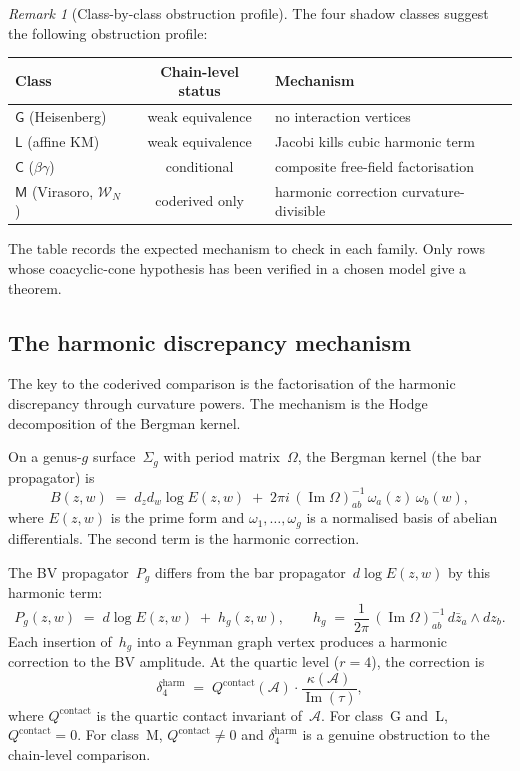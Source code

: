 \documentclass[11pt,reqno]{amsart}
\theoremstyle{definition}
\theoremstyle{remark}
\newtheorem{remark}[theorem]{Remark}
\newcommand{\cA}{\mathcal{A}}
\newcommand{\cW}{\mathcal{W}}
\numberwithin{equation}{section}
\begin{document}
\begin{remark}[Class-by-class obstruction profile]
\label{rem:class-by-class}
The four shadow classes suggest the following obstruction profile:
\begin{center}
\small
\renewcommand{\arraystretch}{1.15}
\begin{tabular}{lcl}
\toprule
Class & Chain-level status & Mechanism \\
\midrule
$\mathsf{G}$ (Heisenberg) & weak equivalence
 & no interaction vertices \\
$\mathsf{L}$ (affine KM) & weak equivalence
 & Jacobi kills cubic harmonic term \\
$\mathsf{C}$ ($\beta\gamma$) & conditional
 & composite free-field factorisation \\
$\mathsf{M}$ (Virasoro, $\cW_N$) & coderived only
 & harmonic correction curvature-divisible \\
\bottomrule
\end{tabular}
\end{center}
The table records the expected mechanism to check in each family.
Only rows whose coacyclic-cone hypothesis has been verified in a
chosen model give a theorem.
\end{remark}

\subsection{The harmonic discrepancy mechanism}
\label{subsec:harmonic-mechanism}

The key to the coderived comparison is the factorisation of
the harmonic discrepancy through curvature powers.  The
mechanism is the Hodge decomposition of the Bergman kernel.

On a genus-$g$ surface~$\Sigma_g$ with period
matrix~$\Omega$, the Bergman kernel (the bar propagator) is
\begin{equation}\label{eq:bergman-g}
B(z,w)
\;=\;
d_z d_w \log E(z,w)
\;+\;
2\pi i\, (\operatorname{Im}\Omega)^{-1}_{ab}\,
\omega_a(z)\,\omega_b(w),
\end{equation}
where $E(z,w)$ is the prime form and
$\omega_1,\ldots,\omega_g$ is a normalised basis of abelian
differentials.  The second term is the harmonic correction.

The BV propagator~$P_g$ differs from the bar
propagator~$d\log E(z,w)$ by this harmonic term:
\[
P_g(z,w)
\;=\;
d\log E(z,w)
\;+\;
h_g(z,w),
\qquad
h_g
\;=\;
\frac{1}{2\pi}\,
(\operatorname{Im}\Omega)^{-1}_{ab}\,
d\bar z_a \wedge dz_b.
\]
Each insertion of~$h_g$ into a Feynman graph vertex produces
a harmonic correction to the BV amplitude.  At the quartic
level ($r = 4$), the correction is
\begin{equation}\label{eq:quartic-obstruction}
\delta_4^{\mathrm{harm}}
\;=\;
Q^{\mathrm{contact}}(\cA)
\cdot \frac{\kappa(\cA)}{\operatorname{Im}(\tau)},
\end{equation}
where $Q^{\mathrm{contact}}$ is the quartic contact invariant
of~$\cA$.  For class~G and~L, $Q^{\mathrm{contact}} = 0$.
For class~M, $Q^{\mathrm{contact}} \neq 0$ and
$\delta_4^{\mathrm{harm}}$ is a genuine obstruction to the
chain-level comparison.
\end{document}

